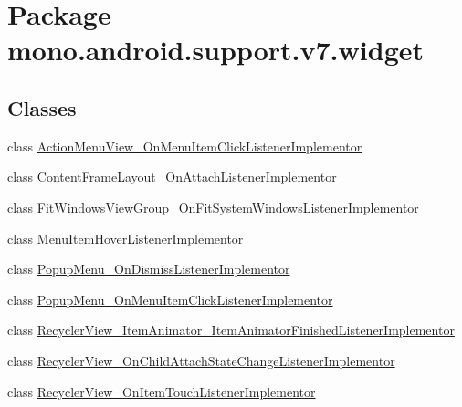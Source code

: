 \hypertarget{namespacemono_1_1android_1_1support_1_1v7_1_1widget}{
\section{Package mono.android.support.v7.widget}
\label{namespacemono_1_1android_1_1support_1_1v7_1_1widget}
}
\subsection*{Classes}
\begin{CompactItemize}
\item 
class \hyperlink{classmono_1_1android_1_1support_1_1v7_1_1widget_1_1_action_menu_view___on_menu_item_click_listener_implementor}{ActionMenuView\_\-OnMenuItemClickListenerImplementor}
\item 
class \hyperlink{classmono_1_1android_1_1support_1_1v7_1_1widget_1_1_content_frame_layout___on_attach_listener_implementor}{ContentFrameLayout\_\-OnAttachListenerImplementor}
\item 
class \hyperlink{classmono_1_1android_1_1support_1_1v7_1_1widget_1_1_fit_windows_view_group___on_fit_system_windows_listener_implementor}{FitWindowsViewGroup\_\-OnFitSystemWindowsListenerImplementor}
\item 
class \hyperlink{classmono_1_1android_1_1support_1_1v7_1_1widget_1_1_menu_item_hover_listener_implementor}{MenuItemHoverListenerImplementor}
\item 
class \hyperlink{classmono_1_1android_1_1support_1_1v7_1_1widget_1_1_popup_menu___on_dismiss_listener_implementor}{PopupMenu\_\-OnDismissListenerImplementor}
\item 
class \hyperlink{classmono_1_1android_1_1support_1_1v7_1_1widget_1_1_popup_menu___on_menu_item_click_listener_implementor}{PopupMenu\_\-OnMenuItemClickListenerImplementor}
\item 
class \hyperlink{classmono_1_1android_1_1support_1_1v7_1_1widget_1_1_recycler_view___item_animator___item_animator_finished_listener_implementor}{RecyclerView\_\-ItemAnimator\_\-ItemAnimatorFinishedListenerImplementor}
\item 
class \hyperlink{classmono_1_1android_1_1support_1_1v7_1_1widget_1_1_recycler_view___on_child_attach_state_change_listener_implementor}{RecyclerView\_\-OnChildAttachStateChangeListenerImplementor}
\item 
class \hyperlink{classmono_1_1android_1_1support_1_1v7_1_1widget_1_1_recycler_view___on_item_touch_listener_implementor}{RecyclerView\_\-OnItemTouchListenerImplementor}

\end{CompactItemize}
